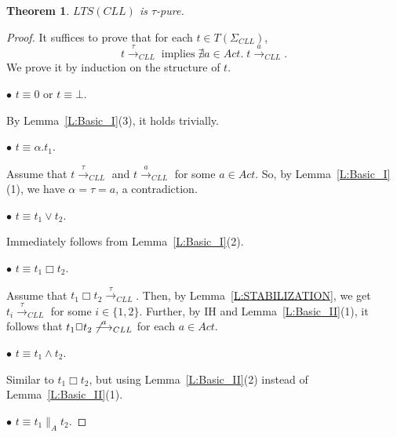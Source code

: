 \documentclass{elsarticle}
\theoremstyle{plain}
\newtheorem{theorem}{Theorem}[section]
\theoremstyle{definition}
\begin{document}
\begin{theorem}\label{L:TAU_PURE}
    $LTS({CLL})$ is $\tau$-pure.
\end{theorem}
\begin{proof}
It suffices to prove that for each $t\in T(\Sigma_{CLL})$,
  \[t \stackrel{\tau}{\longrightarrow}_{{CLL}}  \;\text{implies}\; \nexists a\in Act.\;t\stackrel{a}{\longrightarrow}_{{CLL}}.\]
We prove it by induction on the structure of $t$.


\noindent $\bullet$ $t \equiv 0$ or $t \equiv \bot$.

        By Lemma~\ref{L:Basic_I}(3), it holds trivially.

  \noindent $\bullet$ $t \equiv \alpha.t_1$.

          Assume that $t \stackrel{\tau}{\longrightarrow}_{{CLL}}$ and $t \stackrel{a}{\longrightarrow}_{{CLL}}$ for some $a\in Act$.
         So, by Lemma~\ref{L:Basic_I}(1), we have $\alpha = \tau = a$, a contradiction.

  \noindent $\bullet$ $t \equiv t_1 \vee t_2$.

        Immediately follows from Lemma~\ref{L:Basic_I}(2).

  \noindent $\bullet$ $t \equiv t_1 \Box t_2$.

        Assume that $t_1 \Box t_2 \stackrel{\tau}{\longrightarrow}_{{CLL}}$.
        Then, by Lemma~\ref{L:STABILIZATION}, we get $t_i \stackrel{\tau}{\longrightarrow}_{CLL}$ for some $i\in \{1,2\}$. Further, by IH and Lemma~\ref{L:Basic_II}(1), it follows that $t_1 \Box t_2 \not\stackrel{a}{\longrightarrow}_{CLL}$ for each $a\in Act$.

  \noindent $\bullet$ $t \equiv t_1 \wedge t_2$.

        Similar to $t_1 \Box t_2$, but using Lemma~\ref{L:Basic_II}(2) instead of Lemma~\ref{L:Basic_II}(1).

  \noindent $\bullet$ $t \equiv t_1 \parallel_A t_2$.


\end{proof}
\end{document}
